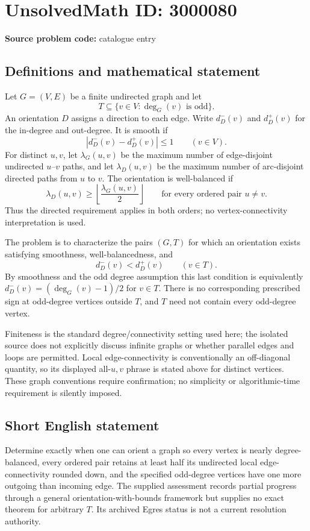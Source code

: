 \documentclass[11pt]{article}
\begin{document}
\section*{UnsolvedMath ID: 3000080}
\textbf{Source problem code:} catalogue entry
\subsection{Definitions and mathematical statement}
Let $G=(V,E)$ be a finite undirected graph and let
\[
 T\subseteq\{v\in V:\deg_G(v)\text{ is odd}\}.
\]
An orientation $D$ assigns a direction to each edge. Write $d_D^-(v)$ and $d_D^+(v)$ for the in-degree and out-degree. It is smooth if
\[
 |d_D^-(v)-d_D^+(v)|\leq1\qquad(v\in V).
\]
For distinct $u,v$, let $\lambda_G(u,v)$ be the maximum number of edge-disjoint undirected $u$--$v$ paths, and let $\lambda_D(u,v)$ be the maximum number of arc-disjoint directed paths from $u$ to $v$. The orientation is well-balanced if
\[
 \lambda_D(u,v)\geq\left\lfloor\frac{\lambda_G(u,v)}2\right\rfloor
 \qquad\text{for every ordered pair }u\ne v.
\]
Thus the directed requirement applies in both orders; no vertex-connectivity interpretation is used.

The problem is to characterize the pairs $(G,T)$ for which an orientation exists satisfying smoothness, well-balancedness, and
\[
 d_D^-(v)<d_D^+(v)\qquad(v\in T).
\]
By smoothness and the odd degree assumption this last condition is equivalently $d_D^-(v)=(\deg_G(v)-1)/2$ for $v\in T$. There is no corresponding prescribed sign at odd-degree vertices outside $T$, and $T$ need not contain every odd-degree vertex.

Finiteness is the standard degree/connectivity setting used here; the isolated source does not explicitly discuss infinite graphs or whether parallel edges and loops are permitted. Local edge-connectivity is conventionally an off-diagonal quantity, so its displayed all-$u,v$ phrase is stated above for distinct vertices. These graph conventions require confirmation; no simplicity or algorithmic-time requirement is silently imposed.
\subsection{Short English statement}
Determine exactly when one can orient a graph so every vertex is nearly degree-balanced, every ordered pair retains at least half its undirected local edge-connectivity rounded down, and the specified odd-degree vertices have one more outgoing than incoming edge. The supplied assessment records partial progress through a general orientation-with-bounds framework but supplies no exact theorem for arbitrary $T$. Its archived Egres status is not a current resolution authority.
\end{document}

